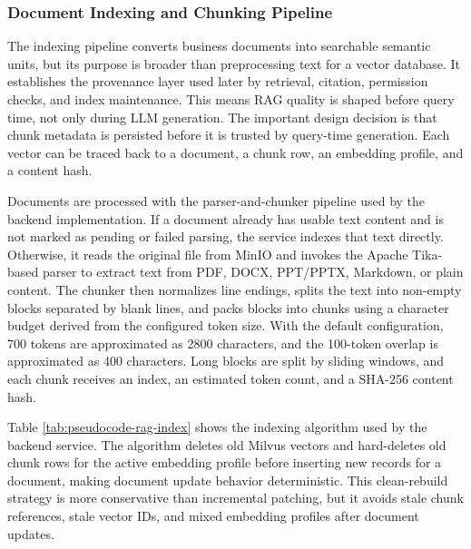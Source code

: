 \subsubsection{Document Indexing and Chunking Pipeline}

The indexing pipeline converts business documents into searchable semantic units, but its purpose is broader than preprocessing text for a vector database. It establishes the provenance layer used later by retrieval, citation, permission checks, and index maintenance. This means RAG quality is shaped before query time, not only during LLM generation. The important design decision is that chunk metadata is persisted before it is trusted by query-time generation. Each vector can be traced back to a document, a chunk row, an embedding profile, and a content hash.

Documents are processed with the parser-and-chunker pipeline used by the backend implementation. If a document already has usable text content and is not marked as pending or failed parsing, the service indexes that text directly. Otherwise, it reads the original file from MinIO and invokes the Apache Tika-based parser to extract text from PDF, DOCX, PPT/PPTX, Markdown, or plain content. The chunker then normalizes line endings, splits the text into non-empty blocks separated by blank lines, and packs blocks into chunks using a character budget derived from the configured token size. With the default configuration, 700 tokens are approximated as 2800 characters, and the 100-token overlap is approximated as 400 characters. Long blocks are split by sliding windows, and each chunk receives an index, an estimated token count, and a SHA-256 content hash.

Table \ref{tab:pseudocode-rag-index} shows the indexing algorithm used by the backend service. The algorithm deletes old Milvus vectors and hard-deletes old chunk rows for the active embedding profile before inserting new records for a document, making document update behavior deterministic. This clean-rebuild strategy is more conservative than incremental patching, but it avoids stale chunk references, stale vector IDs, and mixed embedding profiles after document updates.

\vspace{3mm}
\needspace{0.72\textheight}

